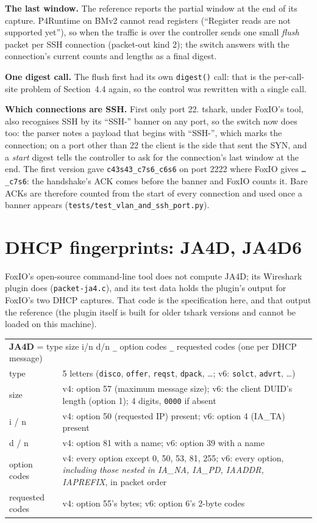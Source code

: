 \documentclass[11pt,a4paper]{article}
\newcommand{\code}[1]{\texttt{#1}}
\begin{document}
\textbf{The last window.} The reference reports the partial window at the end of its capture. P4Runtime on BMv2
cannot read registers (``Register reads are not supported yet''), so when the traffic is over the controller sends
one small \emph{flush} packet per SSH connection (packet-out kind 2); the switch answers with the connection's
current counts and lengths as a final digest.

\textbf{One digest call.} The flush first had its own \code{digest()} call: that is the per-call-site problem of
Section~4.4 again, so the control was rewritten with a single call.

\textbf{Which connections are SSH.} First only port 22. tshark, under FoxIO's tool, also recognises SSH by its
``SSH-'' banner on any port, so the switch now does too: the parser notes a payload that begins with ``SSH-'', which
marks the connection; on a port other than 22 the client is the side that sent the SYN, and a \emph{start} digest
tells the controller to ask for the connection's last window at the end. The first version gave
\code{c43s43\_c7s6\_c6s6} on port 2222 where FoxIO gives \code{\ldots\_c7s6}: the handshake's ACK comes before the
banner and FoxIO counts it. Bare ACKs are therefore counted from the start of every connection and used once a
banner appears (\code{tests/test\_vlan\_and\_ssh\_port.py}).

\section{DHCP fingerprints: JA4D, JA4D6}

FoxIO's open-source command-line tool does not compute JA4D; its Wireshark plugin does (\code{packet-ja4.c}), and its
test data holds the plugin's output for FoxIO's two DHCP captures. That code is the specification here, and that
output the reference (the plugin itself is built for older tshark versions and cannot be loaded on this machine).

\begin{tabularx}{\textwidth}{l X}
\toprule
\multicolumn{2}{l}{\textbf{JA4D} = type size i/n d/n \code{\_} option codes \code{\_} requested codes \quad (one per DHCP message)} \\
type & 5 letters (\code{disco}, \code{offer}, \code{reqst}, \code{dpack}, \ldots; v6: \code{solct}, \code{advrt}, \ldots) \\
size & v4: option 57 (maximum message size); v6: the client DUID's length (option 1); 4 digits, \code{0000} if absent \\
i / n & v4: option 50 (requested IP) present; v6: option 4 (IA\_TA) present \\
d / n & v4: option 81 with a name; v6: option 39 with a name \\
option codes & v4: every option except 0, 50, 53, 81, 255; v6: every option, \emph{including those nested in IA\_NA, IA\_PD, IAADDR, IAPREFIX}, in packet order \\
requested codes & v4: option 55's bytes; v6: option 6's 2-byte codes \\
\bottomrule
\end{tabularx}
\end{document}
